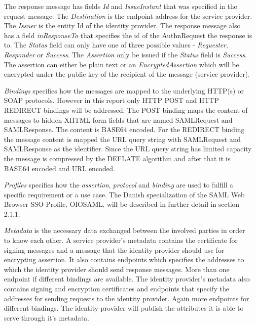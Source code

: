 \documentclass[twosided]{report}
\begin{document}
The response message has fields \emph{Id} and \emph{IssueInstant} that was specified in the request message. The \emph{Destination} is the endpoint address for the service provider. The \emph{Issuer} is the entity Id of the identity provider. The response message also has a field \emph{inResponseTo} that specifies the id of the AuthnRequest the response is to. The \emph{Status} field can only have one of three possible values - \emph{Requester}, \emph{Responder} or \emph{Success}. The \emph{Assertion} only be issued if the \emph{Status} field is \emph{Success}. The assertion can either be plain text or an \emph{EncryptedAssertion} which will be encrypted under the public key of the recipient of the message (service provider).

\par
\emph{Bindings} specifies how the messages are mapped to the underlying HTTP(s) or SOAP protocols. However in this report only HTTP POST and HTTP REDIRECT bindings will be addressed. The POST binding maps the content of messages to hidden XHTML form fields that are named SAMLRequest and SAMLResponse. The content is BASE64 encoded. For the REDIRECT binding the message content is mapped the URL query string with SAMLRequest and SAMLResponse as the identifier. Since the URL query string has limited capacity the message is compressed by the DEFLATE algorithm and after that it is BASE64 encoded and URL encoded.
\par
\emph{Profiles} specifies how the \emph{assertion}, \emph{protocol} and \emph{binding} are used to fulfill a specific requirement or a use case. The Danish specialization of the SAML Web Browser SSO Profile, OIOSAML, will be described in further detail in section 2.1.1.
\par
\emph{Metadata} is the necessary data exchanged between the involved parties in order to know each other. A service provider's metadata contains the certificate for signing messages and a message that the identity provider should use for encrypting assertion. It also contains endpoints which specifies the addresses to which the identity provider should send response messages. More than one endpoint if different bindings are available. The identity provider's metadata also contains signing and encryption certificates and endpoints that specify the addresses for sending requests to the identity provider. Again more endpoints for different bindings. The identity provider will publish the attributes it is able to serve through it's metadata.
\end{document}
